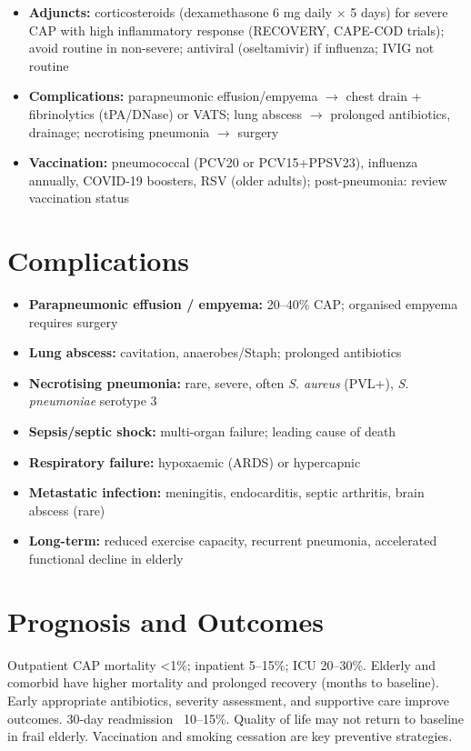\begin{itemize}
    \item \textbf{Adjuncts:} corticosteroids (dexamethasone 6 mg daily $\times$ 5 days) for severe CAP with high inflammatory response (RECOVERY, CAPE-COD trials); avoid routine in non-severe; antiviral (oseltamivir) if influenza; IVIG not routine
    \item \textbf{Complications:} parapneumonic effusion/empyema $\to$ chest drain + fibrinolytics (tPA/DNase) or VATS; lung abscess $\to$ prolonged antibiotics, drainage; necrotising pneumonia $\to$ surgery
    \item \textbf{Vaccination:} pneumococcal (PCV20 or PCV15+PPSV23), influenza annually, COVID-19 boosters, RSV (older adults); post-pneumonia: review vaccination status
\end{itemize}

\section*{Complications}
\begin{itemize}
    \item \textbf{Parapneumonic effusion / empyema:} 20--40\% CAP; organised empyema requires surgery
    \item \textbf{Lung abscess:} cavitation, anaerobes/Staph; prolonged antibiotics
    \item \textbf{Necrotising pneumonia:} rare, severe, often \textit{S. aureus} (PVL+), \textit{S. pneumoniae} serotype 3
    \item \textbf{Sepsis/septic shock:} multi-organ failure; leading cause of death
    \item \textbf{Respiratory failure:} hypoxaemic (ARDS) or hypercapnic
    \item \textbf{Metastatic infection:} meningitis, endocarditis, septic arthritis, brain abscess (rare)
    \item \textbf{Long-term:} reduced exercise capacity, recurrent pneumonia, accelerated functional decline in elderly
\end{itemize}

\section*{Prognosis and Outcomes}
Outpatient CAP mortality <1\%; inpatient 5--15\%; ICU 20--30\%. Elderly and comorbid have higher mortality and prolonged recovery (months to baseline). Early appropriate antibiotics, severity assessment, and supportive care improve outcomes. 30-day readmission ~10--15\%. Quality of life may not return to baseline in frail elderly. Vaccination and smoking cessation are key preventive strategies.

